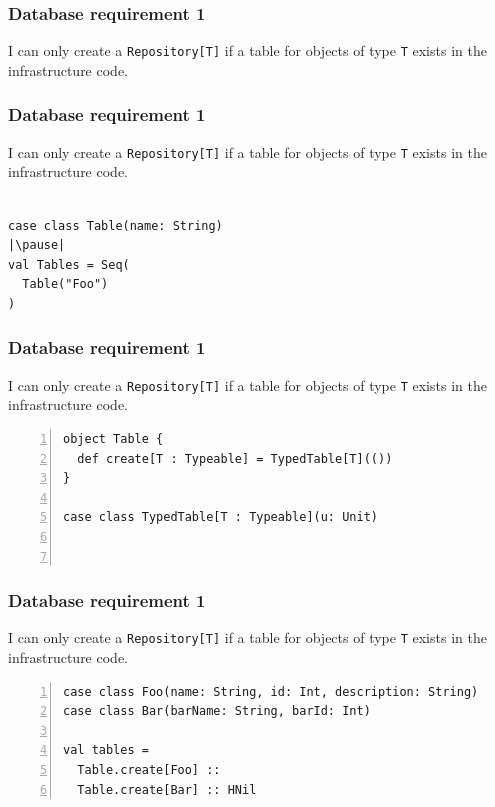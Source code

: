 \documentclass[aspectratio=169]{beamer}
\begin{document}
\begin{frame}[fragile]
\frametitle{Database requirement 1}
I can only create a \texttt{Repository[T]} if a table for objects of type \texttt{T} exists in the infrastructure code.
\hfill \break

\end{frame}

\begin{frame}[fragile]
\frametitle{Database requirement 1}
I can only create a \texttt{Repository[T]} if a table for objects of type \texttt{T} exists in the infrastructure code.
\hfill \break
\begin{lstlisting}[style=myScalaStyle,frame=none,escapeinside=||]

case class Table(name: String)
|\pause|
val Tables = Seq(
  Table("Foo")
)

\end{lstlisting}

\end{frame}

\begin{frame}[fragile]
\frametitle{Database requirement 1}
I can only create a \texttt{Repository[T]} if a table for objects of type \texttt{T} exists in the infrastructure code.
\hfill \break
\begin{lstlisting}[style=myScalaStyle,frame=none,escapeinside=||,numbers=left]
object Table {
  def create[T : Typeable] = TypedTable[T](())
}

case class TypedTable[T : Typeable](u: Unit)
  
 

\end{lstlisting}

\end{frame}

\begin{frame}[fragile]
\frametitle{Database requirement 1}
I can only create a \texttt{Repository[T]} if a table for objects of type \texttt{T} exists in the infrastructure code.
\hfill \break
\begin{lstlisting}[style=myScalaStyle,frame=none,escapeinside=||,numbers=left]
case class Foo(name: String, id: Int, description: String)
case class Bar(barName: String, barId: Int)

val tables =
  Table.create[Foo] ::
  Table.create[Bar] :: HNil

\end{lstlisting}

\end{frame}
\end{document}
